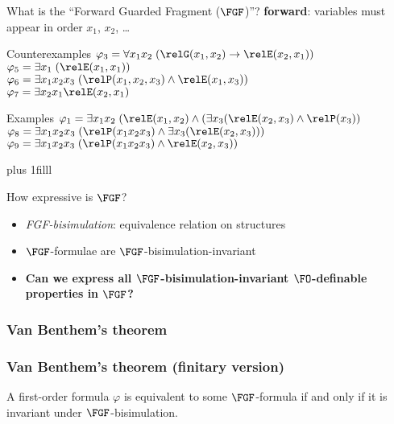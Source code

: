 \documentclass[169]{beamer}
\begin{document}
\begin{frame}{What is the ``Forward Guarded Fragment ($\FGF$)''?}
  \textbf{forward}: variables must appear in order $x_{1}$, $x_2$, \ldots
  \vspace{0.5em}
  \begin{alertblock}{Counterexamples}
    $\varphi_{3} = \forall{x_{1}x_{2}}\; (\relG(x_{1}, x_{2}) \to \relE(x_{2}, x_{1}))$ \\[1em]
    $\varphi_{5} = \exists{x_{1}}\; (\relE(x_{1}, x_{1}))$ \\[1em]
    $\varphi_{6} = \exists{x_{1}x_{2}x_{3}}\; (\relP(x_{1}, x_{2}, x_{3}) \land \relE(x_{1}, x_{3}))$ \\[1em]
    $\varphi_{7} = \exists{x_{2}x_{1}} \relE(x_{2}, x_{1})$
  \end{alertblock}

  \begin{exampleblock}{Examples}
    $\varphi_{1} = \exists{x_{1}x_{2}}\; (\relE(x_{1}, x_{2}) \land (\exists{x_{3}}(\relE(x_{2}, x_{3}) \land \relP(x_{3}))$ \\[1em]

    $\varphi_{8} = \exists{x_{1}x_{2}x_{3}}\; (\relP(x_{1}x_{2}x_{3}) \land \exists{x_{3}}(\relE(x_{2}, x_{3})))$ \\[1em]
    $\varphi_{9} = \exists{x_{1}x_{2}x_{3}}\; (\relP(x_{1}x_{2}x_{3}) \land \relE(x_{2}, x_{3}))$ \\[1em]
  \end{exampleblock}

  \vskip 0pt plus 1filll
\end{frame}

\begin{frame}{How expressive is $\FGF$?}
  \begin{center}
    
  \end{center}
  \begin{itemize}
    \item \emph{FGF-bisimulation}: equivalence relation on structures
    \item $\FGF$-formulae are $\FGF$-bisimulation-invariant
    \item \textbf{Can we express all $\FGF$-bisimulation-invariant $\FO$-definable properties in $\FGF$?}
  \end{itemize}
\end{frame}

\begin{frame}\frametitle<1>{Van Benthem's theorem}\frametitle<2>{Van Benthem's theorem (finitary version)}
  \begin{theorem}
    A first-order formula $\varphi$ is equivalent to some $\FGF$-formula if and only if it is invariant under $\FGF$-bisimulation.
  \end{theorem}
\end{frame}
\end{document}
